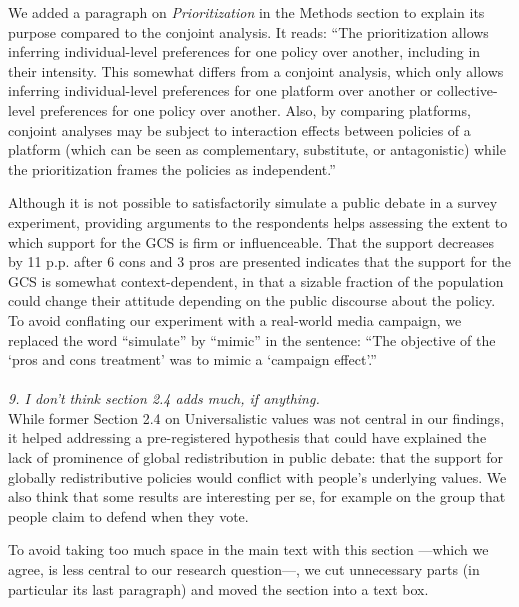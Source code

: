 \documentclass[12pt,english]{article}
\begin{document}
We added a paragraph on \textit{Prioritization} in the Methods section to explain its purpose compared to the conjoint analysis. It reads: ``The prioritization allows inferring individual-level preferences for one policy over another, including in their intensity. This somewhat differs from a conjoint analysis, which only allows inferring individual-level preferences for one platform over another or collective-level preferences for one policy over another. Also, by comparing platforms, conjoint analyses may be subject to interaction effects between policies of a platform (which can be seen as complementary, substitute, or antagonistic) while the prioritization frames the policies as independent.''


Although it is not possible to satisfactorily simulate a public debate in a survey experiment, providing arguments to the respondents helps assessing the extent to which support for the GCS is firm or influenceable. That the support decreases by 11 p.p. after 6 cons and 3 pros are presented indicates that the support for the GCS is somewhat context-dependent, in that a sizable fraction of the population could change their attitude depending on the public discourse about the policy. To avoid conflating our experiment with a real-world media campaign, we replaced the word ``simulate'' by ``mimic'' in the sentence: ``The objective of the `pros and cons treatment' was to mimic a `campaign effect'.''
~\\ ~\\

\textit{9. I don’t think section 2.4 adds much, if anything.}~\\

While former Section 2.4 on Universalistic values was not central in our findings, it helped addressing a pre-registered hypothesis that could have explained the lack of prominence of global redistribution in public debate: that the support for globally redistributive policies would conflict with people's underlying values. We also think that some results are interesting per se, for example on the group that people claim to defend when they vote. 


To avoid taking too much space in the main text with this section ---which we agree, is less central to our research question---, we cut unnecessary parts (in particular its last paragraph) and moved the section into a text box.
~\\ ~\\
\end{document}
